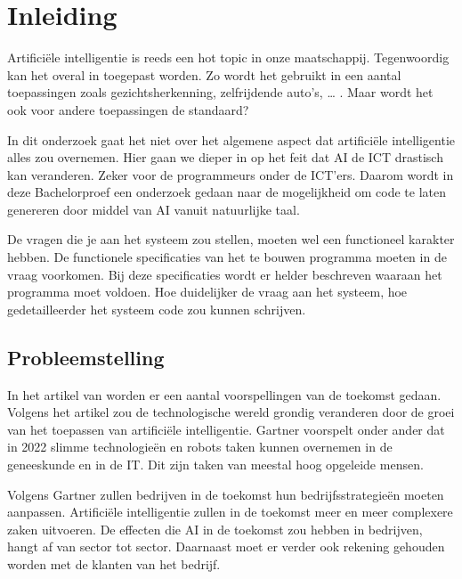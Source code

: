 
\chapter{Inleiding}
\label{ch:inleiding}

Artificiële intelligentie is reeds een hot topic in onze maatschappij. Tegenwoordig kan het overal in toegepast worden. Zo wordt het gebruikt in een aantal toepassingen zoals gezichtsherkenning, zelfrijdende auto’s, … . Maar wordt het ook voor andere toepassingen de standaard?

In dit onderzoek gaat het niet over het algemene aspect dat artificiële intelligentie alles zou overnemen. Hier gaan we dieper in op het feit dat AI de ICT drastisch kan veranderen. Zeker voor de programmeurs onder de ICT’ers. Daarom wordt in deze Bachelorproef een onderzoek gedaan naar de mogelijkheid om code te laten genereren door middel van AI vanuit natuurlijke taal. 

De vragen die je aan het systeem zou stellen, moeten wel een functioneel karakter hebben. De functionele specificaties van het te bouwen programma moeten in de vraag voorkomen. Bij deze specificaties wordt er helder beschreven waaraan het programma moet voldoen. Hoe duidelijker de vraag aan het systeem, hoe gedetailleerder het systeem code zou kunnen schrijven.  

\section{Probleemstelling}
\label{sec:probleemstelling}

In het artikel van \textcite{Gartner} worden er een aantal voorspellingen van de toekomst gedaan. Volgens het artikel zou de technologische wereld grondig veranderen door de groei van het toepassen van artificiële intelligentie.  Gartner voorspelt onder ander dat in 2022 slimme technologieën en robots taken kunnen overnemen in de geneeskunde en in de IT. Dit zijn taken van meestal hoog opgeleide mensen.

Volgens Gartner zullen bedrijven in de toekomst hun bedrijfsstrategieën moeten aanpassen. Artificiële intelligentie zullen in de toekomst meer en meer complexere zaken uitvoeren. De effecten die AI in de toekomst zou hebben in bedrijven, hangt af van sector tot sector. Daarnaast moet er verder ook rekening gehouden worden met de klanten van het bedrijf. 

